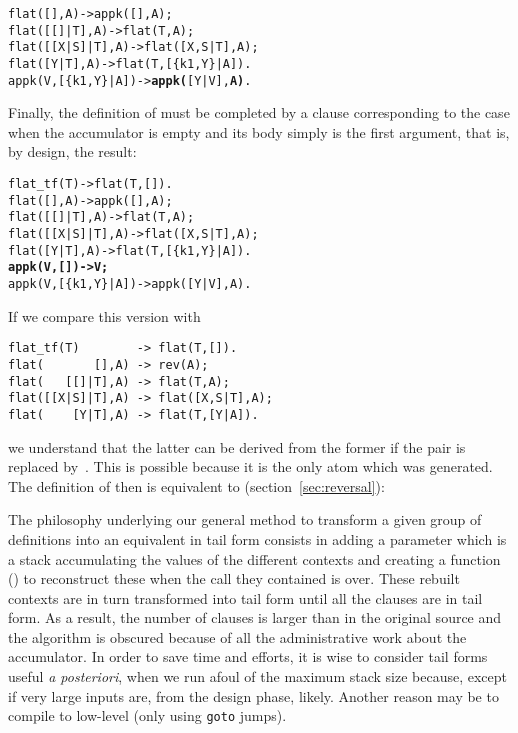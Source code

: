 \begin{enumerate}
\begin{alltt}
flat(       [],A)  -> appk([],A);
flat(   [[]|T],A)  -> flat(T,A);
flat([[X|S]|T],A)  -> flat([X,S|T],A);
flat(    [Y|T],A)  -> flat(T,[\{k1,Y\}|A]).
appk(V,[\{k1,Y\}|A]) -> \textbf{appk(}[Y|V],\textbf{A)}.
\end{alltt}
Finally, the definition of  must be completed by a
clause corresponding to the case when the accumulator is empty and its
body simply is the first argument, that is, by design, the result:
\begin{alltt}
flat\_tf(T)         -> flat(T,[]).
flat(       [],A)  -> appk([],A);
flat(   [[]|T],A)  -> flat(T,A);
flat([[X|S]|T],A)  -> flat([X,S|T],A);
flat(    [Y|T],A)  -> flat(T,[\{k1,Y\}|A]).
\textbf{appk(V,        []) -> V;}
appk(V,[\{k1,Y\}|A]) -> appk([Y|V],A).
\end{alltt}
If we compare this version with 
\begin{verbatim}
flat_tf(T)        -> flat(T,[]).
flat(       [],A) -> rev(A);
flat(   [[]|T],A) -> flat(T,A);
flat([[X|S]|T],A) -> flat([X,S|T],A);
flat(    [Y|T],A) -> flat(T,[Y|A]).
\end{verbatim}
we understand that the latter can be derived from the former if the
pair  is replaced by~. This is possible
because it is the only atom which was generated. The definition of
 then is equivalent to 
(section~\vref{sec:reversal}):

\end{enumerate}
The philosophy underlying our general method to transform a given
group of definitions into an equivalent in tail form consists in
adding a parameter which is a stack accumulating the values of the
different contexts and creating a function () to
reconstruct these when the call they contained is over. These rebuilt
contexts are in turn transformed into tail form until all the clauses
are in tail form. As a result, the number of clauses is larger than in
the original source and the algorithm is obscured because of all the
administrative work about the accumulator. In order to save time and
efforts, it is wise to consider tail forms useful \emph{a posteriori},
when we run afoul of the maximum stack size because, except if very
large inputs are, from the design phase, likely. Another reason may be
to compile to low\hyp{}level \Clang (only using \texttt{goto} jumps).

